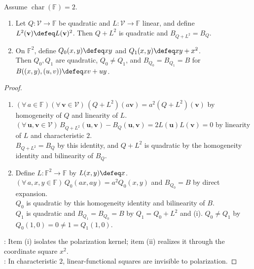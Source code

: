 \begin{proposition} \label{prop:characteristic-two-square-perturbations} \\
Assume $\operatorname{char}(\mathbb{F})=2$.
\begin{enumerate}[label=(\roman*)]
\setlength{\itemsep}{0pt}
\item Let $Q:\mathcal{V}\to\mathbb{F}$ be quadratic and $L:\mathcal{V}\to\mathbb{F}$ linear, and define $L^2(\mathbf{v})\defeq L(\mathbf{v})^2$. Then $Q+L^2$ is quadratic and $B_{Q+L^2}=B_Q$.
\item On $\mathbb{F}^2$, define $Q_0(x,y)\defeq xy$ and $Q_1(x,y)\defeq xy+x^2$.\\
Then $Q_0,Q_1$ are quadratic, $Q_0\neq Q_1$, and $B_{Q_0}=B_{Q_1}=B$ for $B((x,y),(u,v))\defeq xv+uy$.
\end{enumerate}
\begin{proof}
\begin{enumerate}[label=(\roman*)]
\setlength{\itemsep}{0pt}
\item[$(i)$] $(\forall\,a\in\mathbb{F})(\forall\,\mathbf{v}\in\mathcal{V})\,(Q+L^2)(a\mathbf{v})=a^2(Q+L^2)(\mathbf{v})$ by homogeneity of $Q$ and linearity of $L$. $(\forall\,\mathbf{u},\mathbf{v}\in\mathcal{V})\,B_{Q+L^2}(\mathbf{u},\mathbf{v})-B_Q(\mathbf{u},\mathbf{v})=2L(\mathbf{u})L(\mathbf{v})=0$ by linearity of $L$ and characteristic $2$.\\
$B_{Q+L^2}=B_Q$ by this identity, and $Q+L^2$ is quadratic by the homogeneity identity and bilinearity of $B_Q$.
\item[$(ii)$] Define $L:\mathbb{F}^2\to\mathbb{F}$ by $L(x,y)\defeq x$.\\
$(\forall\,a,x,y\in\mathbb{F})\,Q_0(ax,ay)=a^2Q_0(x,y)$ and $B_{Q_0}=B$ by direct expansion.\\
$Q_0$ is quadratic by this homogeneity identity and bilinearity of $B$.\\
$Q_1$ is quadratic and $B_{Q_1}=B_{Q_0}=B$ by $Q_1=Q_0+L^2$ and (i). $Q_0\neq Q_1$ by $Q_0(1,0)=0\neq1=Q_1(1,0)$.
\end{enumerate}
: Item (i) isolates the polarization kernel; item (ii) realizes it through the coordinate square $x^2$.\\
: In characteristic $2$, linear-functional squares are invisible to polarization.
\end{proof}
\end{proposition}

